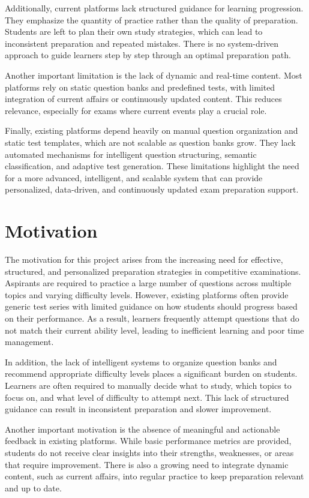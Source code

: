 \begin{sloppypar}
Additionally, current platforms lack structured guidance for learning progression. They emphasize the quantity of practice rather than the quality of preparation. Students are left to plan their own study strategies, which can lead to inconsistent preparation and repeated mistakes. There is no system-driven approach to guide learners step by step through an optimal preparation path.

Another important limitation is the lack of dynamic and real-time content. Most platforms rely on static question banks and predefined tests, with limited integration of current affairs or continuously updated content. This reduces relevance, especially for exams where current events play a crucial role.

Finally, existing platforms depend heavily on manual question organization and static test templates, which are not scalable as question banks grow. They lack automated mechanisms for intelligent question structuring, semantic classification, and adaptive test generation. These limitations highlight the need for a more advanced, intelligent, and scalable system that can provide personalized, data-driven, and continuously updated exam preparation support.

\section{Motivation}

The motivation for this project arises from the increasing need for effective, structured, and personalized preparation strategies in competitive examinations. Aspirants are required to practice a large number of questions across multiple topics and varying difficulty levels. However, existing platforms often provide generic test series with limited guidance on how students should progress based on their performance. As a result, learners frequently attempt questions that do not match their current ability level, leading to inefficient learning and poor time management.

In addition, the lack of intelligent systems to organize question banks and recommend appropriate difficulty levels places a significant burden on students. Learners are often required to manually decide what to study, which topics to focus on, and what level of difficulty to attempt next. This lack of structured guidance can result in inconsistent preparation and slower improvement.

Another important motivation is the absence of meaningful and actionable feedback in existing platforms. While basic performance metrics are provided, students do not receive clear insights into their strengths, weaknesses, or areas that require improvement. There is also a growing need to integrate dynamic content, such as current affairs, into regular practice to keep preparation relevant and up to date.


\end{sloppypar}

